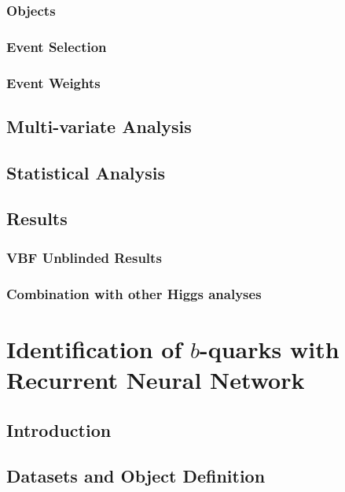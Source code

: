 \documentclass{report}
\begin{document}
\subsection{Objects}

\subsection{Event Selection}

\subsection{Event Weights}

\clearpage

\section{Multi-variate Analysis}

\clearpage

\section{Statistical Analysis}

\clearpage

\section{Results}
\subsection{VBF \Hbb Unblinded Results}

\subsection{Combination with other Higgs analyses}
%

\clearpage


\chapter{Identification of $b$-quarks with Recurrent Neural Network}
\label{chap:btagging}
\section{Introduction}


\section{Datasets and Object Definition}

\end{document}
